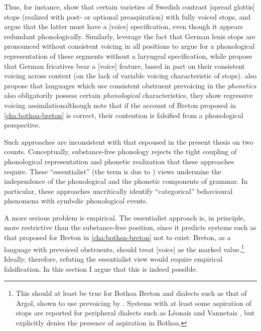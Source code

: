 Thus, for instance, \citet{HelgasonRingen2004,helgason08:_voicin_swedis,beckman11:_rate_swedis_vot} show that certain varieties of Swedish contrast [spread glottis] stops (realized with post- or optional preaspiration) with fully voiced stops, and argue that the latter must have a [voice] specification, even though it appears redundant phonologically. Similarly, \citet{iverson95,jessen02:_laryn_german} leverage the fact that German lenis stops are pronounced without consistent voicing in all positions to argue for a phonological representation of these segments without a laryngeal specification, while \citet{beckman09:_german} propose that German fricatives bear a [voice] feature, based in part on their consistent voicing across context (\ie on the lack of variable voicing characteristic of stops).  also propose that languages which use consistent obstruent prevoicing in the \emph{phonetics} also obligatorily possess certain \emph{phonological} characteristics, \ie they show regressive voicing assimilation\dash although note that if the account of Breton proposed in \cref{cha:bothoa-breton} is correct, their contention is falsified from a phonological perspective.

Such approaches are inconsistent with that espoused in the present thesis on two counts. Conceptually, substance\hyp free phonology rejects the tight coupling of phonological representation and phonetic realization that these approaches require. These \enquote{essentialist} (the term is due to \citealt{kingston09:_voice}) views undermine the independence of the phonological and the phonetic components of grammar. In particular, these approaches  uncritically identify \enquote{categorical} behavioural phenomena with symbolic phonological events.

A more serious problem is empirical. The essentialist approach is, in principle, more restrictive than the substance\hyp free position, since it predicts systems such as that proposed for Breton in \cref{cha:bothoa-breton} not to exist: Breton, as a language with prevoiced obstruents, should treat [voice] as the marked value.\footnote{This should at least be true for Bothoa Breton and dialects such as that of Argol, shown to use prevoicing by \citet{Bot82}. Systems with at least some aspiration of stops are reported for peripheral dialects such as Léonais \citep{falchun} and Vannetais \citep{Ter70}, but \citet{humphreys95:_phonol_bothoa_saint_nicol_pelem} explicitly denies the presence of aspiration in Bothoa.} Ideally, therefore, refuting the essentialist view would require empirical falsification. In this section I argue that this is indeed possible.


